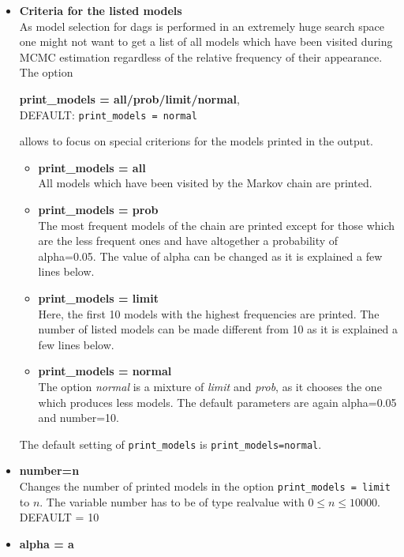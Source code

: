 \begin{itemize}
\item {\bf Criteria for the listed models} \\
    As model selection for dags is performed in an extremely huge search space one might not want
    to get a list of all models which have been visited during MCMC estimation regardless of the
    relative frequency of their appearance. The option
    \begin{center}
    {\bf print\_models = all/prob/limit/normal}, \\
    \hspace*{-1.8cm}  DEFAULT: \texttt{print\_models = normal}
    \end{center}
    allows to focus
    on special criterions for the models printed in the output.
\begin{itemize}
\item {\bf print\_models = all}  \\
    All models which have been visited by the Markov chain are printed.
\item {\bf print\_models = prob} \\
    The most frequent models of the chain are printed except for those which are the less frequent
    ones and have altogether a probability of alpha=0.05. The value of alpha can be changed as
    it is explained a few lines below.
\item {\bf print\_models = limit} \\
    Here, the first 10 models with the highest frequencies are printed. The number of listed models
    can be made different from 10 as it is explained a few lines below.
\item {\bf print\_models = normal} \\
    The option {\it normal} is a mixture of {\it limit} and {\it prob}, as it chooses the one
    which produces less models. The default parameters are again alpha=0.05 and number=10.
\end{itemize}
The default setting of  \texttt{print\_models} is
\texttt{print\_models=normal}.
\item {\bf number=n} \\
    Changes the number of printed models in the option  \texttt{print\_models = limit} to $n$.
    The variable number has to be of type realvalue with $0 \leq n \leq 10000$. \\
    DEFAULT = 10
\item {\bf alpha = a} \\

\end{itemize}
